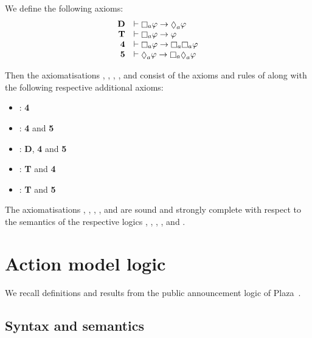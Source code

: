 \begin{definition}
We define the following axioms:
$$
\begin{array}{rl}
    {\bf D}     & \proves \necessary[\agentA] \phi \implies \possible[\agentA] \phi\\
    {\bf T}     & \proves \necessary[\agentA] \phi \implies \phi\\
    {\bf 4}     & \proves \necessary[\agentA] \phi \implies \necessary[\agentA] \necessary[\agentA] \phi\\
    {\bf 5}     & \proves \possible[\agentA] \phi \implies \necessary[\agentA] \possible[\agentA] \phi
\end{array}
$$

Then the axiomatisations \axiomKF{}, \axiomKFF{}, \axiomKD{}, \axiomSF{}, and \axiomS{} consist of the axioms and rules of \axiomK{} along with the following respective additional axioms:
\begin{itemize}
    \item \axiomKF{}: {\bf 4}
    \item \axiomKFF{}: {\bf 4} and {\bf 5}
    \item \axiomKD{}: {\bf D}, {\bf 4} and {\bf 5}
    \item \axiomSF{}: {\bf T} and {\bf 4}
    \item \axiomS{}: {\bf T} and {\bf 5}
\end{itemize}
\end{definition}

\begin{proposition}
The axiomatisations \axiomKF{}, \axiomKFF{}, \axiomKD{}, \axiomSF{}, and \axiomS{} are sound and strongly complete with respect to the semantics of the respective logics \logicKF{}, \logicKFF{}, \logicKD{}, \logicSF{}, and \logicS{}.
\end{proposition}

\section{Action model logic}\label{aml}

We recall definitions and results from the public announcement logic of Plaza~\cite{plaza:1989}.

\subsection{Syntax and semantics}

